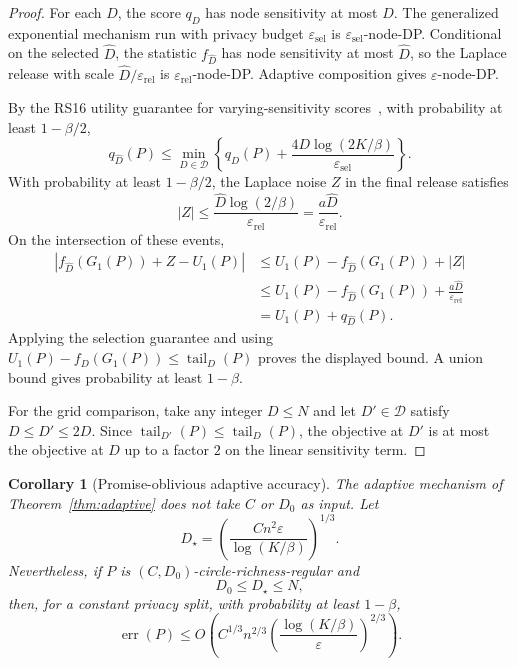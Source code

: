 \documentclass[11pt]{article}
\newtheorem{corollary}[theorem]{Corollary}
\newcommand{\eps}{\varepsilon}
\newcommand{\calD}{\mathcal{D}}
\newcommand{\tail}{\operatorname{tail}}
\begin{document}
\begin{proof}
For each \(D\), the score \(q_D\) has node sensitivity at most \(D\). The generalized exponential mechanism run with privacy budget \(\eps_{\mathrm{sel}}\) is \(\eps_{\mathrm{sel}}\)-node-DP. Conditional on the selected \(\widehat D\), the statistic \(f_{\widehat D}\) has node sensitivity at most \(\widehat D\), so the Laplace release with scale \(\widehat D/\eps_{\mathrm{rel}}\) is \(\eps_{\mathrm{rel}}\)-node-DP. Adaptive composition gives \(\eps\)-node-DP.

By the RS16 utility guarantee for varying-sensitivity scores~\cite[Theorem~1.4]{RS16}, with probability at least \(1-\beta/2\),
\[
q_{\widehat D}(P)\le
\min_{D\in\calD}
\left\{q_D(P)+\frac{4D\log(2K/\beta)}{\eps_{\mathrm{sel}}}\right\}.
\]
With probability at least \(1-\beta/2\), the Laplace noise \(Z\) in the final release satisfies
\[
|Z|\le \frac{\widehat D\log(2/\beta)}{\eps_{\mathrm{rel}}}=\frac{a\widehat D}{\eps_{\mathrm{rel}}}.
\]
On the intersection of these events,
\begin{align*}
|f_{\widehat D}(G_1(P))+Z-U_1(P)|
&\le U_1(P)-f_{\widehat D}(G_1(P))+|Z|\\
&\le U_1(P)-f_{\widehat D}(G_1(P))+\frac{a\widehat D}{\eps_{\mathrm{rel}}}\\
&=U_1(P)+q_{\widehat D}(P).
\end{align*}
Applying the selection guarantee and using \(U_1(P)-f_D(G_1(P))\le \tail_D(P)\) proves the displayed bound. A union bound gives probability at least \(1-\beta\).

For the grid comparison, take any integer \(D\le N\) and let \(D'\in\calD\) satisfy \(D\le D'\le 2D\). Since \(\tail_{D'}(P)\le \tail_D(P)\), the objective at \(D'\) is at most the objective at \(D\) up to a factor \(2\) on the linear sensitivity term.
\end{proof}

\begin{corollary}[Promise-oblivious adaptive accuracy]
\label{cor:promise-oblivious}
The adaptive mechanism of Theorem~\ref{thm:adaptive} does not take \(C\) or \(D_0\) as input. Let
\[
D_\star=\left(\frac{C n^2\eps}{\log(K/\beta)}\right)^{1/3}.
\]
Nevertheless, if \(P\) is \((C,D_0)\)-circle-richness-regular and
\[
D_0\le D_\star\le N,
\]
then, for a constant privacy split, with probability at least \(1-\beta\),
\[
\operatorname{err}(P)\le
O\!\left(C^{1/3}n^{2/3}\left(\frac{\log(K/\beta)}{\eps}\right)^{2/3}\right).
\]
\end{corollary}
\end{document}
